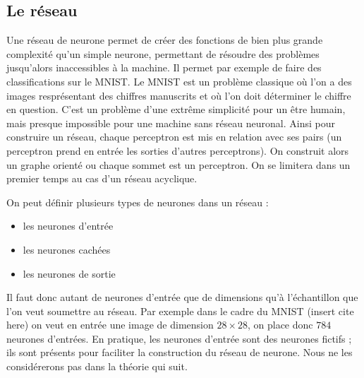 
\subsection{Le réseau}

Une réseau de neurone permet de créer des fonctions de bien plus grande
complexité qu'un simple neurone, permettant de résoudre des problèmes
jusqu'alors inaccessibles à la machine. Il permet par exemple de faire des
classifications sur le MNIST.
Le MNIST est un problème classique où l'on a des images resprésentant
des chiffres manuscrits et où l'on doit déterminer le chiffre en
question. C'est un problème d'une extrême simplicité pour un être humain, mais
presque impossible pour une machine sans réseau neuronal. Ainsi
pour construire un réseau, chaque perceptron est mis en relation avec ses pairs
(un perceptron prend en entrée les sorties d'autres perceptrons). On construit
alors un graphe orienté ou chaque sommet est un perceptron. On se limitera dans
un premier temps au cas d'un réseau acyclique.

\bigskip

On peut définir plusieurs types de neurones dans un réseau :
\begin{itemize}
\item les neurones d'entrée
\item les neurones cachées
\item les neurones de sortie
\end{itemize}

\bigskip

Il faut donc autant de neurones d'entrée que de dimensions qu'à l'échantillon
que l'on veut soumettre au réseau. Par exemple dans le cadre du MNIST (insert cite here)
on veut en entrée une image de dimension $28 \times 28$, on place donc $784$
neurones d'entrées. En pratique, les neurones d'entrée sont des neurones
fictifs ; ils sont présents pour faciliter la construction du réseau de neurone.
Nous ne les considérerons pas dans la théorie qui suit.

